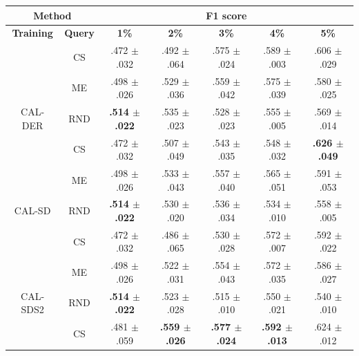 \begin{table}[htbp]
\centering

\begin{tabular*}{\linewidth}{c|c|@{\extracolsep{\fill}}ccccc}
\toprule
\multicolumn{2}{c|}{\textbf{Method}} & \multicolumn{5}{c}{\textbf{F1 score}} \\
\midrule
\textbf{Training} & \textbf{Query} & \textbf{1\%} & \textbf{2\%} & \textbf{3\%} & \textbf{4\%} & \textbf{5\%}\\
\midrule
 & CS & .472 $\pm$ {\small .032} & .492 $\pm$ {\small .064} & .575 $\pm$ {\small .024} & .589 $\pm$ {\small .003} & .606 $\pm$ {\small .029}\\

 & ME & .498 $\pm$ {\small .026} & .529 $\pm$ {\small .036} & .559 $\pm$ {\small .042} & .575 $\pm$ {\small .039} & .580 $\pm$ {\small .025}\\

\multirow{-3}{*}{\raggedright\arraybackslash CAL-DER} & RND & \textbf{.514 $\pm$ {\small .022}} & .535 $\pm$ {\small .023} & .528 $\pm$ {\small .023} & .555 $\pm$ {\small .005} & .569 $\pm$ {\small .014}\\
\midrule
 & CS & .472 $\pm$ {\small .032} & .507 $\pm$ {\small .049} & .543 $\pm$ {\small .035} & .548 $\pm$ {\small .032} & \textbf{.626 $\pm$ {\small .049}}\\

 & ME & .498 $\pm$ {\small .026} & .533 $\pm$ {\small .043} & .557 $\pm$ {\small .040} & .565 $\pm$ {\small .051} & .591 $\pm$ {\small .053}\\

\multirow{-3}{*}{\raggedright\arraybackslash CAL-SD} & RND & \textbf{.514 $\pm$ {\small .022}} & .530 $\pm$ {\small .020} & .536 $\pm$ {\small .034} & .534 $\pm$ {\small .010} & .558 $\pm$ {\small .005}\\
\midrule
 & CS & .472 $\pm$ {\small .032} & .486 $\pm$ {\small .065} & .530 $\pm$ {\small .028} & .572 $\pm$ {\small .007} & .592 $\pm$ {\small .022}\\

 & ME & .498 $\pm$ {\small .026} & .522 $\pm$ {\small .031} & .554 $\pm$ {\small .043} & .572 $\pm$ {\small .035} & .586 $\pm$ {\small .027}\\

\multirow{-3}{*}{\raggedright\arraybackslash CAL-SDS2} & RND & \textbf{.514 $\pm$ {\small .022}} & .523 $\pm$ {\small .028} & .515 $\pm$ {\small .010} & .550 $\pm$ {\small .021} & .540 $\pm$ {\small .010}\\
\midrule
 & CS & .481 $\pm$ {\small .059} & \textbf{.559 $\pm$ {\small .026}} & \textbf{.577 $\pm$ {\small .024}} & \textbf{.592 $\pm$ {\small .013}} & .624 $\pm$ {\small .012}\\


\end{tabular*}
\end{table}
